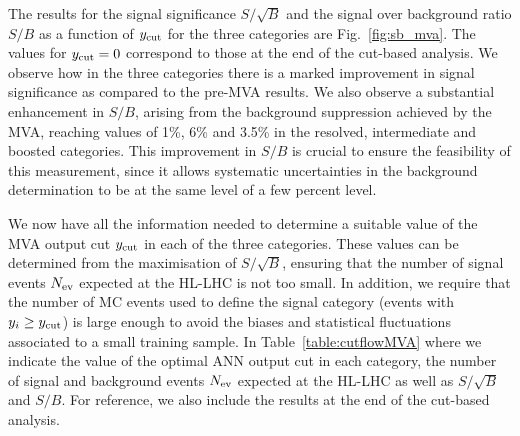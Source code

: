 The results for the signal significance $S/\sqrt{B}$ and
the signal over background ratio
$S/B$ as a function of $y_{\rm cut}$
for the three categories are
Fig.~\ref{fig:sb_mva}.
%
The values 
for $y_{\rm cut}=0$ correspond to those at
the end of the cut-based analysis.
%
We observe how in the three
 categories there is a marked  improvement in signal
significance as compared to the pre-MVA results.
%
We also observe a substantial enhancement in $S/B$, arising
from the background suppression achieved by the MVA, reaching
values of 1\%, 6\% and 3.5\% in the resolved,
intermediate and boosted categories.
%
This improvement in $S/B$ is crucial to ensure the feasibility
of this measurement, since it allows systematic
uncertainties in the background determination to
be at the same level of a few percent level.

We now have all the
information needed to determine a suitable
value of the MVA output cut $y_{\rm cut}$ in each
of the three categories.
%
These values can be determined from the maximisation of $S/\sqrt{B}$,
ensuring that the number of signal events $N_{\rm ev}$
expected at the HL-LHC is not too small.
%
In  addition, we require
that the number of MC events used to define the signal
category (events with $y_i \ge y_{\rm cut}$)
is large enough to avoid the biases and statistical
fluctuations associated to a small training sample.
%
In Table~\ref{table:cutflowMVA} where we indicate
the value of the optimal ANN output
cut in each category,
the number of signal and background events $N_{\rm ev}$ expected
at the HL-LHC as well as $S/\sqrt{B}$ and $S/B$.
%
For reference, we also include the results at the end of
the cut-based
analysis.
%

